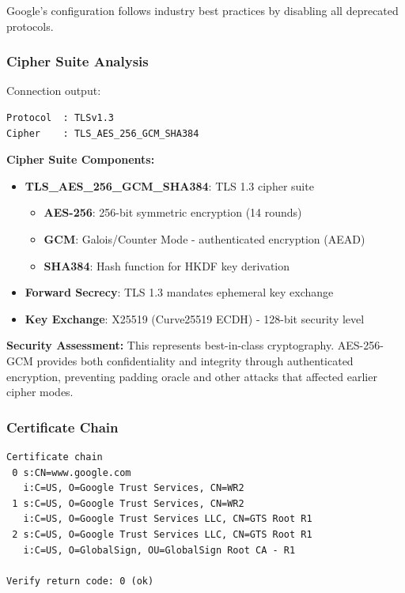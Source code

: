 \documentclass[12pt,a4paper]{article}
\begin{document}
Google's configuration follows industry best practices by disabling all deprecated protocols.

\subsubsection{Cipher Suite Analysis}

Connection output:
\begin{lstlisting}[style=outputstyle]
Protocol  : TLSv1.3
Cipher    : TLS_AES_256_GCM_SHA384
\end{lstlisting}

\textbf{Cipher Suite Components:}
\begin{itemize}
    \item \textbf{TLS\_AES\_256\_GCM\_SHA384}: TLS 1.3 cipher suite
    \begin{itemize}
        \item \textbf{AES-256}: 256-bit symmetric encryption (14 rounds)
        \item \textbf{GCM}: Galois/Counter Mode - authenticated encryption (AEAD)
        \item \textbf{SHA384}: Hash function for HKDF key derivation
    \end{itemize}
    \item \textbf{Forward Secrecy}: TLS 1.3 mandates ephemeral key exchange
    \item \textbf{Key Exchange}: X25519 (Curve25519 ECDH) - 128-bit security level
\end{itemize}

\textbf{Security Assessment:} This represents best-in-class cryptography. AES-256-GCM provides both confidentiality and integrity through authenticated encryption, preventing padding oracle and other attacks that affected earlier cipher modes.

\subsubsection{Certificate Chain}

\begin{lstlisting}[style=outputstyle]
Certificate chain
 0 s:CN=www.google.com
   i:C=US, O=Google Trust Services, CN=WR2
 1 s:C=US, O=Google Trust Services, CN=WR2
   i:C=US, O=Google Trust Services LLC, CN=GTS Root R1
 2 s:C=US, O=Google Trust Services LLC, CN=GTS Root R1
   i:C=US, O=GlobalSign, OU=GlobalSign Root CA - R1

Verify return code: 0 (ok)
\end{lstlisting}
\end{document}
